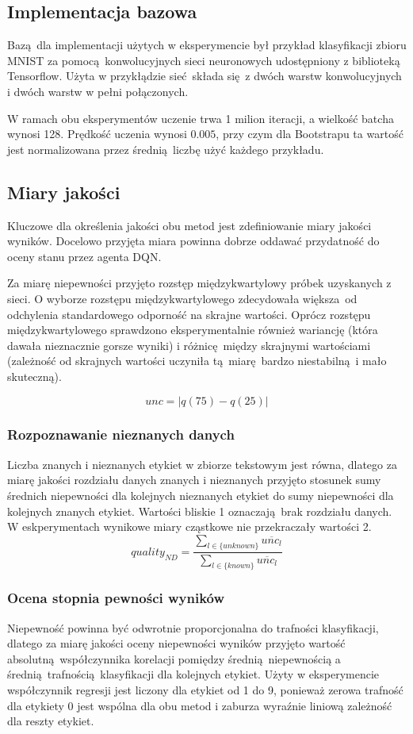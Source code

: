 \subsection{Implementacja bazowa}
Bazą dla implementacji użytych w eksperymencie był przykład klasyfikacji zbioru MNIST za pomocą konwolucyjnych sieci neuronowych udostępniony z biblioteką Tensorflow. Użyta w przykłądzie sieć składa się z dwóch warstw konwolucyjnych i dwóch warstw w pełni połączonych.

W ramach obu eksperymentów uczenie trwa 1 milion iteracji, a wielkość batcha wynosi 128. Prędkość uczenia wynosi $0.005$, przy czym dla Bootstrapu ta wartość jest normalizowana przez średnią liczbę użyć każdego przykładu.

\subsection{Miary jakości}
Kluczowe dla określenia jakości obu metod jest zdefiniowanie miary jakości wyników. Docelowo przyjęta miara powinna dobrze oddawać przydatność do oceny stanu przez agenta DQN.

Za miarę niepewności przyjęto rozstęp międzykwartylowy próbek uzyskanych z sieci. O wyborze rozstępu międzykwartylowego zdecydowała większa od odchylenia standardowego odporność na skrajne wartości. Oprócz rozstępu międzykwartylowego sprawdzono eksperymentalnie również wariancję (która dawała nieznacznie gorsze wyniki) i różnicę między skrajnymi wartościami (zależność od skrajnych wartości uczyniła tą miarę bardzo niestabilną i mało skuteczną).

\[ unc = |q(75) -q(25)|\]

\subsubsection{Rozpoznawanie nieznanych danych}
Liczba znanych i nieznanych etykiet w zbiorze tekstowym jest równa, dlatego za miarę jakości rozdziału danych znanych i nieznanych przyjęto stosunek sumy średnich niepewności dla kolejnych nieznanych etykiet do sumy niepewności dla kolejnych znanych etykiet. Wartości bliskie 1 oznaczają brak rozdziału danych. W eskperymentach wynikowe miary cząstkowe nie przekraczały wartości 2.
\[ quality_{ND} = \frac{\sum_{l \in \{unknown\}} \overline{unc_{l}}}{\sum_{l \in \{known\}} \overline{unc_{l}}}\]

\subsubsection{Ocena stopnia pewności wyników }
Niepewność powinna być odwrotnie proporcjonalna do trafności klasyfikacji, dlatego za miarę jakości oceny niepewności wyników przyjęto wartość absolutną współczynnika korelacji pomiędzy średnią niepewnością a średnią trafnością klasyfikacji dla kolejnych etykiet. Użyty w eksperymencie współczynnik regresji jest liczony dla etykiet od 1 do 9, ponieważ zerowa trafność dla etykiety 0 jest wspólna dla obu metod i zaburza wyraźnie liniową zależność dla reszty etykiet.

